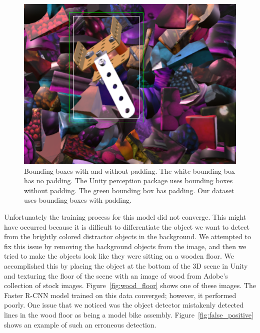\begin{figure}
  \includegraphics[width=\columnwidth]{figures/synthetic/padding.png}
  \caption[Bounding boxes with and without padding]{
    Bounding boxes with and without padding.
    The white bounding box has no padding.
    The Unity perception package uses bounding boxes without padding.
    The green bounding box has padding.
    Our dataset uses bounding boxes with padding.
  }\label{fig:padding}
\end{figure}

Unfortunately the training process for this model did not converge.
This might have occurred because it is difficult to differentiate the object we
want to detect from the brightly colored distractor objects in the background.
We attempted to fix this issue by removing the background objects from the
image, and then we tried to make the objects look like they were sitting on a
wooden floor.
We accomplished this by placing the object at the bottom of the 3D scene in
Unity and texturing the floor of the scene with an image of wood from Adobe's
collection of stock images.
Figure~\ref{fig:wood_floor} shows one of these images.
The Faster R-CNN model trained on this data converged; however, it performed
poorly.
One issue that we noticed was the object detector mistakenly detected lines
in the wood floor as being a model bike assembly.
Figure~\ref{fig:false_positive} shows an example of such an erroneous detection.

